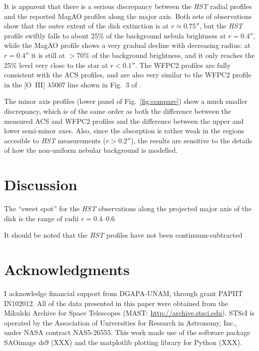 \documentclass[oneside, 11pt]{article}
\begin{document}
It is apparent that there is a serious discrepancy between the \emph{HST} radial profiles and the reported MagAO profiles along the major axis.   Both sets of observations show that the outer extent of the disk extinction is at \(r \simeq 0.75''\), but the \emph{HST} profile swiftly falls to about 25\% of the background nebula brightness at \(r = 0.4''\), while the MagAO profile shows a very gradual decline with decreasing radius: at \(r = 0.4''\) it is still at \(> 70\%\) of the background brightness, and it only reaches the 25\% level very close to the star at \(r < 0.1''\).    The WFPC2 profiles are fully consistent with the ACS profiles, and are also very similar to the WFPC2 profile in the [O~III] \(\lambda 5007\) line shown in Fig.~3 of \citet{McCaughrean:1996a}. 

The minor axis profiles (lower panel of Fig.~\ref{fig:compare}) show a much smaller discrepancy, which is of the same order as both the difference between the measured ACS and WFPC2 profiles and the difference between the upper and lower semi-minor axes.   Also, since the absorption is rather weak in the regions accesible to \textit{HST} measurements (\(r > 0.2''\)), the results are sensitive to the details of how the non-uniform nebular background is modelled. 


\section{Discussion}
\label{sec:discuss}

The ``sweet spot'' for the \textit{HST} observations along the projected major axis of the disk is the range of radii \(r = 0.4\)--\(0.6\) 

It should be noted that the \textit{HST} profiles have not been continuum-subtracted 

\section*{Acknowledgments}
\label{sec:ack}
I acknowledge financial support from DGAPA-UNAM, through grant PAPIIT IN102012.
All of the data presented in this paper were obtained from the Mikulski Archive for Space Telescopes (MAST: \url{http://archive.stsci.edu}).  STScI is operated by the Association of Universities for Research in Astronomy, Inc., under NASA contract NAS5-26555.   This work made use of the software package SAOimage ds9 (XXX) and the matplotlib plotting library for Python (XXX). 




\end{document}

